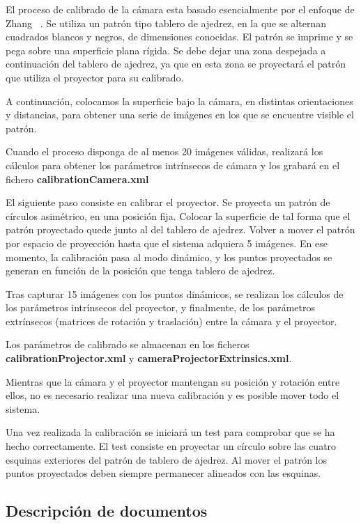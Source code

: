 El proceso de calibrado de la cámara esta basado esencialmente por el enfoque de Zhang
~\cite{Zhang:1999:FCCVPFUO}. Se utiliza un patrón tipo tablero de ajedrez, en la que se alternan
cuadrados blancos y negros, de dimensiones conocidas. El patrón se imprime y se pega sobre una
superficie plana rígida. Se debe dejar una zona despejada a continuación del tablero de ajedrez, ya
que en esta zona se proyectará el patrón que utiliza el proyector para su calibrado.

A continuación, colocamos la superficie bajo la cámara, en distintas orientaciones y distancias,
para obtener una serie de imágenes en los que se encuentre visible el patrón.

Cuando el proceso disponga de al menos 20 imágenes válidas, realizará los cálculos para obtener los
parámetros intrínsecos de cámara y los grabará en el fichero \textbf{calibrationCamera.xml}

El siguiente paso consiste en calibrar el proyector. Se proyecta un patrón de círculos asimétrico,
en una posición fija. Colocar la superficie de tal forma que el patrón proyectado quede junto al del
tablero de ajedrez. Volver a mover el patrón por espacio de proyección hasta que el sistema adquiera
5 imágenes. En ese momento, la calibración pasa al modo dinámico, y los puntos proyectados se
generan en función de la posición que tenga tablero de ajedrez.

Tras capturar 15 imágenes con los puntos dinámicos, se realizan los cálculos de los parámetros
intrínsecos del proyector, y finalmente, de los parámetros extrínsecos (matrices de rotación y
traslación) entre la cámara y el proyector.

Los parámetros de calibrado se almacenan en los ficheros \textbf{calibrationProjector.xml} y
\textbf{cameraProjectorExtrinsics.xml}.

Mientras que la cámara y el proyector mantengan su posición y rotación entre ellos, no es necesario
realizar una nueva calibración y es posible mover todo el sistema.

Una vez realizada la calibración se iniciará un test para comprobar que se ha hecho
correctamente. El test consiste en proyectar un círculo sobre las cuatro esquinas exteriores del
patrón de tablero de ajedrez. Al mover el patrón los puntos proyectados deben siempre permanecer
alineados con las esquinas.

\subsection{Descripción de documentos}


